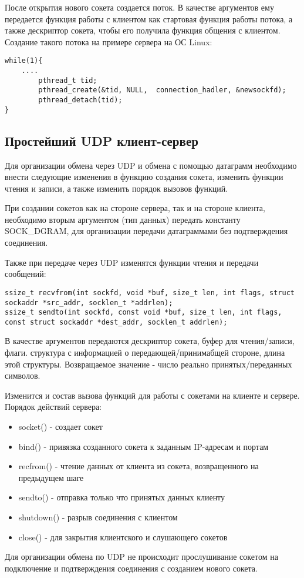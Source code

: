 После открытия нового сокета создается поток. В качестве аргументов ему передается функция работы с клиентом как стартовая функция работы потока, а также дескриптор сокета, чтобы его получила функция общения с клиентом. Создание такого потока на примере сервера на ОС Linux:
\begin{lstlisting}
while(1){
	....
        pthread_t tid;
        pthread_create(&tid, NULL,  connection_hadler, &newsockfd);
        pthread_detach(tid);
}
\end{lstlisting}

\subsection{Простейший UDP клиент-сервер}
Для организации обмена через UDP и обмена с помощью датаграмм необходимо внести следующие изменения в функцию создания сокета, изменить функции чтения и записи, а также изменить порядок вызовов функций.

При создании сокетов как на стороне сервера, так и на стороне клиента, необходимо вторым аргументом (тип данных) передать константу SOCK\_DGRAM, для организации передачи датаграммами без подтверждения соединения.

Также при передаче через UDP изменятся функции чтения и передачи сообщений:
\begin{lstlisting}
ssize_t recvfrom(int sockfd, void *buf, size_t len, int flags, struct sockaddr *src_addr, socklen_t *addrlen);
ssize_t sendto(int sockfd, const void *buf, size_t len, int flags, const struct sockaddr *dest_addr, socklen_t addrlen);
\end{lstlisting}
В качестве аргументов передаются дескриптор сокета, буфер для чтения/записи, флаги. структура с информацией о передающей/принимабщей стороне, длина этой структуры.
Возвращаемое значение - число реально принятых/переданных символов.

Изменится и состав вызова функций для работы с сокетами на клиенте и сервере. 
Порядок действий сервера:
\begin{itemize}
\item socket() - создает сокет
\item bind() - привязка созданного сокета к заданным IP-адресам и портам
\item recfrom() - чтение данных от клиента из сокета, возвращенного на предыдущем шаге
\item sendto() - отправка только что принятых данных клиенту
\item shutdown() - разрыв соединения с клиентом
\item close() - для закрытия клиентского и слушающего сокетов
\end{itemize}
Для организации обмена по UDP не происходит прослушивание сокетом на подключение и подтверждения соединения с созданием нового сокета.

